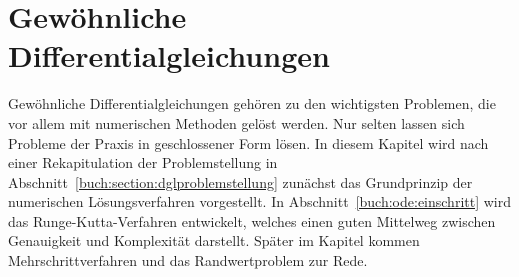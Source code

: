 %
%
%
\chapter{Gewöhnliche Differentialgleichungen\label{chapter:ode}}
\rhead{}
Gewöhnliche Differentialgleichungen gehören zu den wichtigsten
Problemen, die vor allem mit numerischen Methoden gelöst werden.
Nur selten lassen sich Probleme der Praxis in geschlossener
Form lösen.
In diesem Kapitel wird nach einer Rekapitulation der Problemstellung
in Abschnitt~\ref{buch:section:dglproblemstellung}
zunächst das Grundprinzip der numerischen Lösungsverfahren
vorgestellt.
In Abschnitt~\ref{buch:ode:einschritt} wird das Runge-Kutta-Verfahren
entwickelt, welches einen guten Mittelweg zwischen Genauigkeit und
Komplexität darstellt.
Später im Kapitel kommen Mehrschrittverfahren und das Randwertproblem
zur Rede.









